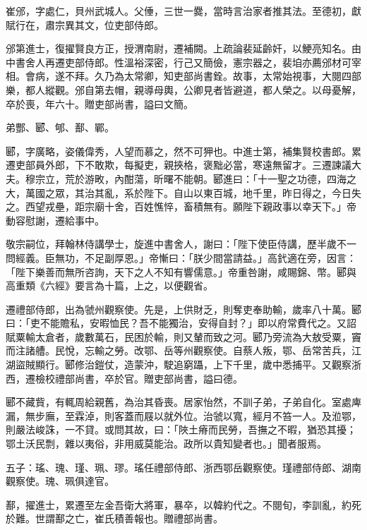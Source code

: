 \begin{pinyinscope}
 崔邠，字處仁，貝州武城人。父倕，三世一爨，當時言治家者推其法。至德初，獻賦行在，肅宗異其文，位吏部侍郎。



 邠第進士，復擢賢良方正，授渭南尉，遷補闕。上疏論裴延齡奸，以鯁亮知名。由中書舍人再遷吏部侍郎。性溫裕深密，行己又簡儉，憲宗器之，裴垍亦薦邠材可宰相。會病，遂不拜。久乃為太常卿，知吏部尚書銓。故事，太常始視事，大閱四部樂，都人縱觀。邠自第去帽，親導母輿，公卿見者皆避道，都人榮之。以母憂解，卒於喪，年六十。贈吏部尚書，謚曰文簡。



 弟酆、郾、郇、鄯、鄲。



 郾，字廣略，姿儀偉秀，人望而慕之，然不可狎也。中進士第，補集賢校書郎。累遷吏部員外郎，下不敢欺，每擬吏，親挾格，褒黜必當，寒遠無留才。三遷諫議大夫。穆宗立，荒於游畋，內酣蕩，昕曙不能朝。郾進曰：「十一聖之功德，四海之大，萬國之眾，其治其亂，系於陛下。自山以東百城，地千里，昨日得之，今日失之。西望戎壘，距宗廟十舍，百姓憔悴，畜積無有。願陛下親政事以幸天下。」帝動容慰謝，遷給事中。



 敬宗嗣位，拜翰林侍講學士，旋進中書舍人，謝曰：「陛下使臣侍講，歷半歲不一問經義。臣無功，不足副厚恩。」帝慚曰：「朕少間當請益。」高釴適在旁，因言：「陛下樂善而無所咨詢，天下之人不知有響儒意。」帝重咎謝，咸賜錦、幣。郾與高重類《六經》要言為十篇，上之，以便觀省。



 遷禮部侍郎，出為虢州觀察使。先是，上供財乏，則奪吏奉助輸，歲率八十萬。郾曰：「吏不能贍私，安暇恤民？吾不能獨治，安得自封？」即以府常費代之。又詔賦粟輸太倉者，歲數萬石，民困於輸，則又輦而致之河。郾乃旁流為大敖受粟，竇而注諸艚。民悅，忘輸之勞。改鄂、岳等州觀察使。自蔡人叛，鄂、岳常苦兵，江湖盜賊顯行。郾修治鎧仗，造蒙沖，駛追窮躡，上下千里，歲中悉捕平。又觀察浙西，遷檢校禮部尚書，卒於官。贈吏部尚書，謚曰德。



 郾不藏貲，有輒周給親舊，為治其昏喪。居家怡然，不訓子弟，子弟自化。室處庳漏，無步廡，至霖淖，則客蓋而屐以就外位。治虢以寬，經月不笞一人。及涖鄂，則嚴法峻誅，一不貸。或問其故，曰：「陜土瘠而民勞，吾撫之不暇，猶恐其擾；鄂土沃民剽，雜以夷俗，非用威莫能治。政所以貴知變者也。」聞者服焉。



 五子：瑤、瑰、瑾、珮、璆。瑤任禮部侍郎、浙西鄂岳觀察使。瑾禮部侍郎、湖南觀察使。瑰、珮俱達官。



 鄯，擢進士，累遷至左金吾衛大將軍，暴卒，以韓約代之。不閱旬，李訓亂，約死於難。世謂鄯之亡，崔氏積善報也。贈禮部尚書。




\end{pinyinscope}

